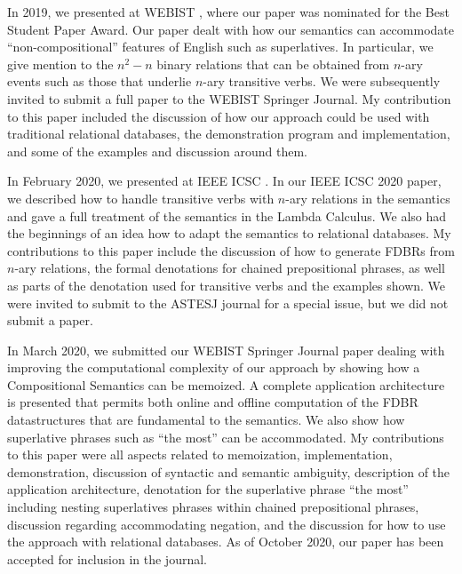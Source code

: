 \documentclass[../main.tex]{subfiles}
\begin{document}
\begin{refsection}
    In 2019, we presented at WEBIST \cite{frostpeelar2019}, where our paper was nominated for the Best Student Paper Award.  Our paper dealt with how our semantics can accommodate ``non-compositional'' features of English such as superlatives.  In particular, we give mention to the $n^2 - n$ binary relations that can be obtained from $n$-ary events such as those that underlie $n$-ary transitive verbs.  We were subsequently invited to submit a full paper to the WEBIST Springer Journal.
    My contribution to this paper included the discussion of how our approach could be used with traditional relational databases, the demonstration program and implementation, and some of the examples and discussion around them.

    In February 2020, we presented at IEEE ICSC \cite{peelar2020compositional}.  In our IEEE ICSC 2020 paper, we described how to handle transitive verbs with $n$-ary relations in the semantics and gave a full treatment of the semantics in the Lambda Calculus.  We also had the beginnings of an idea how to adapt the semantics to relational databases.  My contributions to this paper include the discussion of how to generate FDBRs from $n$-ary relations, the formal denotations for chained prepositional phrases, as well as parts of the denotation used for transitive verbs and the examples shown. We were invited to submit to the ASTESJ journal for a special issue, but we did not submit a paper.

    In March 2020, we submitted our WEBIST Springer Journal \cite{peelar2020webistjournal} paper dealing with improving the computational complexity of our approach by showing how a Compositional Semantics can be memoized.  A complete application architecture is presented that permits both online and offline computation of the FDBR datastructures that are fundamental to the semantics.  We also show how superlative phrases such as ``the most'' can be accommodated.  My contributions to this paper were all aspects related to memoization, implementation, demonstration, discussion of syntactic and semantic ambiguity, description of the application architecture, denotation for the superlative phrase ``the most'' including nesting superlatives phrases within chained prepositional phrases, discussion regarding accommodating negation, and the discussion for how to use the approach with relational databases.  As of October 2020, our paper has been accepted for inclusion in the journal.


\end{refsection}
\end{document}
